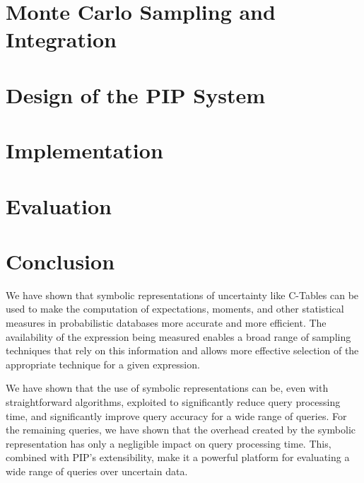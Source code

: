 \documentclass{vldb}
\begin{document}
\section{Monte Carlo Sampling and Integration}
\label{sec:sampling}


\section{Design of the PIP System}
\label{sec:design}


\section{Implementation}
\label{sec:implementation}


\section{Evaluation}
\label{sec:evaluation}



\section{Conclusion}

We have shown that symbolic representations of uncertainty like C-Tables can be used to make the computation of expectations, moments, and other statistical measures in probabilistic databases more accurate and more efficient.  The availability of the expression being measured enables a broad range of sampling techniques that rely on this information and allows more effective selection of the appropriate technique for a given expression.

We have shown that the use of symbolic representations can be, even with straightforward algorithms, exploited to significantly reduce query processing time, and significantly improve query accuracy for a wide range of queries.  For the remaining queries, we have shown that the overhead created by the symbolic representation has only a negligible impact on query processing time.  This, combined with PIP's extensibility, make it a powerful platform for evaluating a wide range of queries over uncertain data.

\begin{small}


\end{small}
\end{document}
